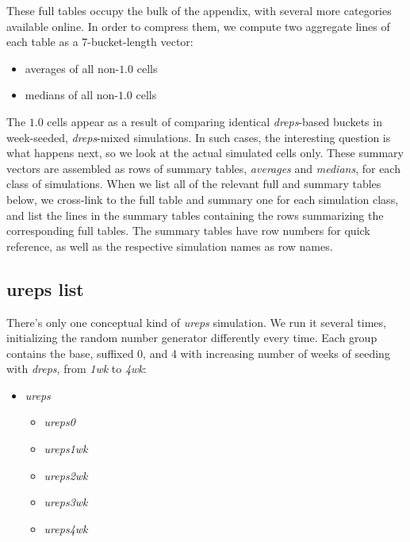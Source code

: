\documentclass[10pt,oneside]{memoir}
\begin{document}
These full tables occupy the bulk of the appendix, with several more categories available online.  In order to compress them, we compute two aggregate lines of each table as a 7-bucket-length vector:


\begin{itemize}


\item averages of all non-$1.0$ cells

\item medians of all non-$1.0$ cells
\end{itemize}

The $1.0$ cells appear as a result of comparing identical {\itshape dreps}-based buckets in week-seeded, {\itshape dreps}-mixed simulations.  In such cases, the interesting question is what happens next, so we look at the actual simulated cells only.  These summary vectors are assembled as rows of summary tables, {\itshape averages} and {\itshape medians}, for each class of simulations.  When we list all of the relevant full and summary tables below, we cross-link to the full table and summary one for each simulation class, and list the lines in the summary tables containing the rows summarizing the corresponding full tables.  The summary tables have row numbers for quick reference, as well as the respective simulation names as row names.


\subsection{ureps list}
\label{urepslist}

There's only one conceptual kind of {\itshape ureps} simulation.  We run it several times, initializing the random number generator differently every time.  Each group contains the base, suffixed $0$, and 4 with increasing number of weeks of seeding with {\itshape dreps}, from {\itshape 1wk} to {\itshape 4wk}:


\begin{itemize}


\item {\itshape ureps}\begin{itemize}


\item {\itshape ureps0}

\item {\itshape ureps1wk}

\item {\itshape ureps2wk}

\item {\itshape ureps3wk}

\item {\itshape ureps4wk}
\end{itemize}


\end{itemize}
\end{document}
